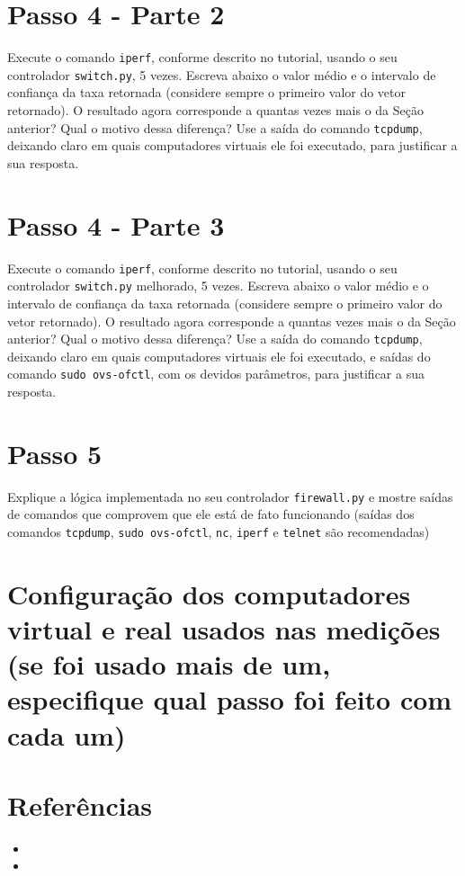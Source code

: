 \documentclass[12pt,letterpaper]{article}
\begin{document}
\section{Passo 4 - Parte 2}


Execute o comando \texttt{iperf}, conforme descrito no tutorial,
usando o seu controlador \texttt{switch.py}, 5 vezes.  Escreva abaixo
o valor médio e o intervalo de confiança da taxa retornada (considere
sempre o primeiro valor do vetor retornado). O resultado agora
corresponde a quantas vezes mais o da Seção anterior?  Qual o motivo
dessa diferença? Use a saída do comando \texttt{tcpdump}, deixando
claro em quais computadores virtuais ele foi executado, para
justificar a sua resposta.


\section{Passo 4 - Parte 3}


Execute o comando \texttt{iperf}, conforme descrito no tutorial,
usando o seu controlador \texttt{switch.py} melhorado, 5 vezes.
Escreva abaixo o valor médio e o intervalo de confiança da taxa
retornada (considere sempre o primeiro valor do vetor retornado). O
resultado agora corresponde a quantas vezes mais o da Seção anterior?
Qual o motivo dessa diferença? Use a saída do comando
\texttt{tcpdump}, deixando claro em quais computadores virtuais ele
foi executado, e saídas do comando \texttt{sudo ovs-ofctl}, com os
devidos parâmetros, para justificar a sua resposta.


\section{Passo 5}


Explique a lógica implementada no seu controlador
\texttt{firewall.py} e mostre saídas de comandos que comprovem que ele
está de fato funcionando (saídas dos comandos \texttt{tcpdump},
\texttt{sudo ovs-ofctl}, \texttt{nc}, \texttt{iperf} e \texttt{telnet}
são recomendadas)


\section{Configuração dos computadores virtual e real usados nas
medições (se foi usado mais de um, especifique qual passo foi feito
com cada um)}

\section{Referências}

\begin{itemize}
   \item
   \item
\end{itemize}
\end{document}
